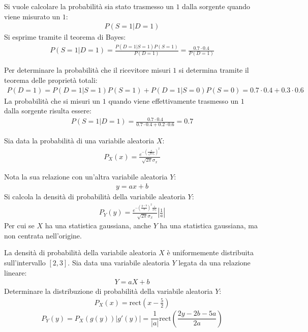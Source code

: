 \documentclass{article}
\newcommand{\rect}{\mbox{rect}}
\begin{document}
Si vuole calcolare la probabilità sia stato trasmesso un $1$ dalla sorgente quando viene misurato un $1$:
\begin{gather*}
    P(S=1|D=1)
\end{gather*}
Si esprime tramite il teorema di Bayes:
\begin{gather*}
    P(S=1|D=1)=\displaystyle\frac{P(D=1|S=1)P(S=1)}{P(D=1)}=\frac{0.7\cdot0.4}{P(D=1)}
\end{gather*}

Per determinare la probabilità che il ricevitore misuri $1$ si determina tramite il teorema delle proprietà totali:
\begin{gather*}
    P(D=1)=P(D=1|S=1)P(S=1)+P(D=1|S=0)P(S=0)=0.7\cdot0.4+0.3\cdot0.6
\end{gather*}
La probabilità che si misuri un $1$ quando viene effettivamente trasmesso un $1$ dalla sorgente risulta essere:
\begin{gather}
    P(S=1|D=1)=\displaystyle\frac{0.7\cdot0.4}{0.7\cdot0.4+0.2\cdot0.6}=0.7
\end{gather}


Sia data la probabilità di una variabile aleatoria $X$:
\begin{gather*}
    P_X(x)=\displaystyle\frac{e^{-\left(\frac{x}{\sqrt{2}{\sigma_x}}\right)^2}}{\sqrt{2\pi}\sigma_x}
\end{gather*}

Nota la sua relazione con un'altra variabile aleatoria $Y$:
\begin{gather*}
    y=ax+b
\end{gather*}
Si calcola la densità di probabilità della variabile aleatoria $Y$:
\begin{gather}
    P_Y(y)=\displaystyle\frac{e^{-\left(\frac{y-b}{a}\right)^2\frac{1}{2\sigma_x^2}}}{\sqrt{2\pi}\sigma_x}\left|\frac{1}{a}\right|
\end{gather}
Per cui se $X$ ha una statistica gaussiana, anche $Y$ ha una statistica gaussiana, ma non centrata nell'origine. 



La densità di probabilità della variabile aleatoria $X$ è uniformemente distribuita sull'intervallo $[2,3]$. Sia data una variabile aleatoria $Y$ legata da una relazione 
lineare:
\begin{gather*}
    Y=aX+b
\end{gather*}
Determinare la distribuzione di probabilità della variabile aleatoria $Y$:
\begin{gather*}
    P_X(x)=\rect\left(x-\displaystyle\frac{5}{2}\right)
\end{gather*}
\begin{equation}
    P_Y(y)=P_X(g(y))|g'(y)|=\displaystyle\frac{1}{|a|}\rect\left(\frac{2y-2b-5a}{2a}\right)
\end{equation}
\end{document}
